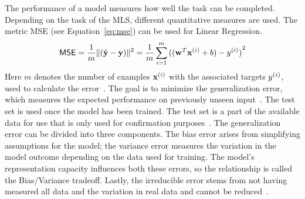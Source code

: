 The performance of a model measures how well the task can be completed.
Depending on the task of the \ac{MLS}, different quantitative measures are used.
The metric \ac{MSE} (see Equation~\ref{eq:mse}) can be used for Linear Regression.
\begin{equation}\label{eq:mse}
    \textsf{MSE} =\frac{1}{m}\lVert{(\hat{\textbf{y}} - \textbf{y})}\rVert^2
        =\frac{1}{m}\sum_{i=1}^m {((\textbf{w}^T \textbf{x}^{(i)} + b) - y^{(i)})}^2
\end{equation}
Here $m$ denotes the number of examples $\textbf{x}^{(i)}$ with the associated targets $y^{(i)}$, used to calculate
the error~\citep{geron_hands-machine_2017,goodfellow_deep_2016}.
The goal is to minimize the generalization error, which measures the expected performance on
previously unseen input~\citep{geron_hands-machine_2017}.
The test set is used once the model has been trained.
The test set is a part of the available data for use that is only used for confirmation
purposes~\citep{geron_hands-machine_2017, goodfellow_deep_2016}.
The generalization error can be divided into three components.
The bias error arises from simplifying assumptions for the model; the variance error measures the
variation in the model outcome depending on the data used for training.
The model's representation capacity influences both these errors, so the
relationship is called the Bias/Variance tradeoff.
Lastly, the irreducible error stems from not having measured all data and the variation
in real data and cannot be
reduced~\citep{ashmore_assuring_2021, james_introduction_2013,geron_hands-machine_2017}.

